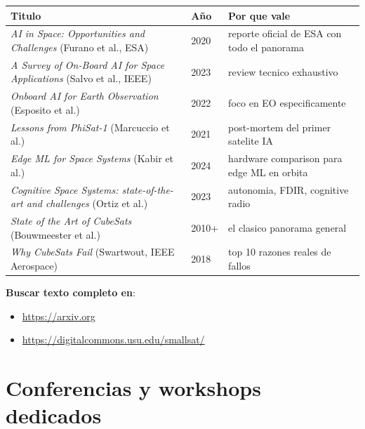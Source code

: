 \documentclass[11pt,a4paper,oneside]{report}
\begin{document}
\begin{longtable}{p{8cm}p{1.5cm}p{6cm}}
\toprule
\textbf{Titulo} & \textbf{Año} & \textbf{Por que vale} \\
\midrule
\endhead
\emph{AI in Space: Opportunities and Challenges} (Furano et al., ESA) & 2020 & reporte oficial de ESA con todo el panorama \\
\emph{A Survey of On-Board AI for Space Applications} (Salvo et al., IEEE) & 2023 & review tecnico exhaustivo \\
\emph{Onboard AI for Earth Observation} (Esposito et al.) & 2022 & foco en EO especificamente \\
\emph{Lessons from PhiSat-1} (Marcuccio et al.) & 2021 & post-mortem del primer satelite IA \\
\emph{Edge ML for Space Systems} (Kabir et al.) & 2024 & hardware comparison para edge ML en orbita \\
\emph{Cognitive Space Systems: state-of-the-art and challenges} (Ortiz et al.) & 2023 & autonomia, FDIR, cognitive radio \\
\emph{State of the Art of CubeSats} (Bouwmeester et al.) & 2010+ & el clasico panorama general \\
\emph{Why CubeSats Fail} (Swartwout, IEEE Aerospace) & 2018 & top 10 razones reales de fallos \\
\bottomrule
\end{longtable}

\textbf{Buscar texto completo en}:
\begin{itemize}[leftmargin=2em]
  \item \url{https://arxiv.org}
  \item \url{https://digitalcommons.usu.edu/smallsat/}
\end{itemize}

\chapter{Conferencias y workshops dedicados}
\end{document}
